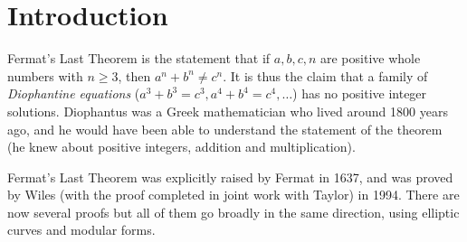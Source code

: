 




\chapter{Introduction}

Fermat's Last Theorem is the statement that if $a,b,c,n$ are positive whole numbers with $n\geq 3$,
then $a^n+b^n\not=c^n$. It is thus the claim that a family of \emph{Diophantine equations}
($a^3+b^3=c^3, a^4+b^4=c^4,\ldots$) has no positive integer solutions.
Diophantus was a Greek mathematician who lived around 1800
years ago, and he would have been able to understand the statement of the theorem (he knew about
positive integers, addition and multiplication).

Fermat's Last Theorem was explicitly raised by Fermat in 1637, and was proved by Wiles (with the
proof completed in joint work with Taylor) in 1994. There are now several proofs but all of them
go broadly in the same direction, using elliptic curves and modular forms.

